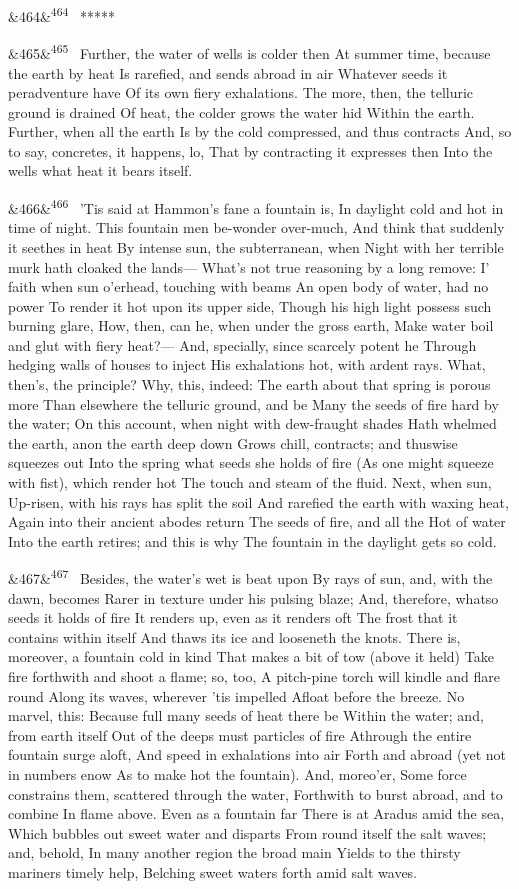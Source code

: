 \documentclass[12pt]{article}
\newcommand{\para}[1][]{\par\noindent\ifx&#1&\else\textsuperscript{\footnotesize #1}~\fi}
\begin{document}
\para[464] *****

\para[465] Further, the water of wells is colder then At summer time, because the earth by heat Is rarefied, and sends abroad in air Whatever seeds it peradventure have Of its own fiery exhalations. The more, then, the telluric ground is drained Of heat, the colder grows the water hid Within the earth. Further, when all the earth Is by the cold compressed, and thus contracts And, so to say, concretes, it happens, lo, That by contracting it expresses then Into the wells what heat it bears itself.

\para[466] 'Tis said at Hammon's fane a fountain is, In daylight cold and hot in time of night. This fountain men be-wonder over-much, And think that suddenly it seethes in heat By intense sun, the subterranean, when Night with her terrible murk hath cloaked the lands--- What's not true reasoning by a long remove: I' faith when sun o'erhead, touching with beams An open body of water, had no power To render it hot upon its upper side, Though his high light possess such burning glare, How, then, can he, when under the gross earth, Make water boil and glut with fiery heat?--- And, specially, since scarcely potent he Through hedging walls of houses to inject His exhalations hot, with ardent rays. What, then's, the principle? Why, this, indeed: The earth about that spring is porous more Than elsewhere the telluric ground, and be Many the seeds of fire hard by the water; On this account, when night with dew-fraught shades Hath whelmed the earth, anon the earth deep down Grows chill, contracts; and thuswise squeezes out Into the spring what seeds she holds of fire (As one might squeeze with fist), which render hot The touch and steam of the fluid. Next, when sun, Up-risen, with his rays has split the soil And rarefied the earth with waxing heat, Again into their ancient abodes return The seeds of fire, and all the Hot of water Into the earth retires; and this is why The fountain in the daylight gets so cold.

\para[467] Besides, the water's wet is beat upon By rays of sun, and, with the dawn, becomes Rarer in texture under his pulsing blaze; And, therefore, whatso seeds it holds of fire It renders up, even as it renders oft The frost that it contains within itself And thaws its ice and looseneth the knots. There is, moreover, a fountain cold in kind That makes a bit of tow (above it held) Take fire forthwith and shoot a flame; so, too, A pitch-pine torch will kindle and flare round Along its waves, wherever 'tis impelled Afloat before the breeze. No marvel, this: Because full many seeds of heat there be Within the water; and, from earth itself Out of the deeps must particles of fire Athrough the entire fountain surge aloft, And speed in exhalations into air Forth and abroad (yet not in numbers enow As to make hot the fountain). And, moreo'er, Some force constrains them, scattered through the water, Forthwith to burst abroad, and to combine In flame above. Even as a fountain far There is at Aradus amid the sea, Which bubbles out sweet water and disparts From round itself the salt waves; and, behold, In many another region the broad main Yields to the thirsty mariners timely help, Belching sweet waters forth amid salt waves.
\end{document}
